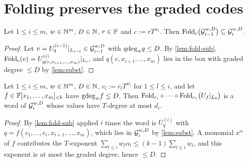 \section{Folding preserves the graded codes}

\begin{lemma}[Stability]\label{lem:stab}
Let $1\le i\le m$, $w\in\mathbb{N}^m$, $D\in\mathbb{N}$, $r\in\mathbb{F}$ and $c:=rT^{w_i}$. Then
$\mathrm{Fold}_c\big(\mathcal{G}_{i-1}^{w,D}\big)\subseteq\mathcal{G}_i^{w,D}$.
\end{lemma}

\begin{proof}
Let $v=U^{(i-1)}_q|_{L_{i-1}}\in\mathcal{G}_{i-1}^{w,D}$ with $\mathrm{gdeg}_wq\le D$. By \cref{lem:fold-sub},
$\mathrm{Fold}_c(v)=U^{(i)}_{q(c,x_{i+1},\dots,x_m)}|_{L_i}$, and $q(c,x_{i+1},\dots,x_m)$ lies in the box
with graded degree $\le D$ by \cref{lem:subst}.
\end{proof}

\begin{lemma}\label{lem:stab-cap}
Let $1\le i\le m$, $w\in\mathbb{N}^m$, $D\in\mathbb{N}$, $c_l:=r_lT^{w_l}$ for $1\le l\le i$, and let
$f\in\mathbb{F}[x_1,\dots,x_m]_{<k}$ have $\mathrm{gdeg}_wf\le D$. Then
$\mathrm{Fold}_{c_i}\circ\cdots\circ\mathrm{Fold}_{c_1}\big(U_f|_{L_0}\big)$ is a word of $\mathcal{G}_i^{w,D}$ whose values
have $T$-degree at most $d_i$.
\end{lemma}

\begin{proof}
By \cref{lem:fold-sub} applied $i$ times the word is $U^{(i)}_q$ with
$q=f(c_1,\dots,c_i,x_{i+1},\dots,x_m)$, which lies in $\mathcal{G}_i^{w,D}$ by \cref{lem:subst}. A monomial
$x^\alpha$ of $f$ contributes the $T$-exponent $\sum_{l\le i}w_l\alpha_l\le(k-1)\sum_{l\le i}w_l$,
and this exponent is at most the graded degree, hence $\le D$.
\end{proof}
